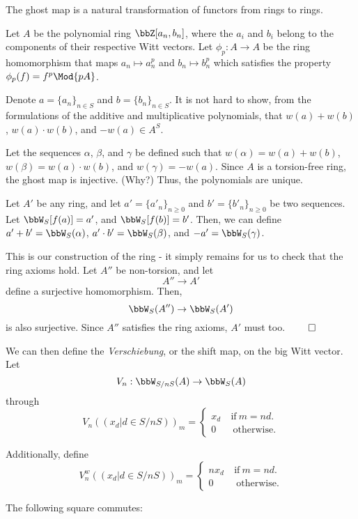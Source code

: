 \documentclass[a4paper, 12pt,oneside,openany]{book}
\begin{document}
The ghost map is a natural transformation of functors from rings to rings. 


 Let $A$ be the polynomial ring $\bbZ[a_n, b_n]$, where the $a_i$ and $b_i$ belong to the components of their respective Witt vectors. Let $\phi_p:A\to A$ be the ring homomorphism that maps $a_n \mapsto a_n^p$ and $b_n \mapsto b_n^p$ which satisfies the property $\phi_p(f)=f^p \Mod{pA}$. 

Denote $a = \{a_n\}_{n\in S}$ and $b = \{b_n\}_{n\in S}.$ It is not hard to show, from the formulations of the additive and multiplicative polynomials, that $w(a)+w(b)$, $w(a)\cdot w(b)$, and $-w(a) \in A^S.$ 

Let the sequences $\alpha$, $\beta$, and $\gamma$ be defined such that $w(\alpha)=w(a)+w(b)$, $w(\beta)=w(a)\cdot w(b)$, and $w(\gamma)=-w(a)$. Since $A$ is a torsion-free ring, the ghost map is injective. (Why?) Thus, the polynomials are unique.

Let $A'$ be any ring, and let $a'=\{a'_n\}_{n\geq0}$ and $b'=\{b'_n\}_{n\geq0}$ be two sequences. Let $\bbW_S[f(a)]=a'$, and $\bbW_S[f(b)]=b'$. Then, we can define $a'+b'=\bbW_S(\alpha)$, $a'\cdot b'=\bbW_S(\beta)$, and $-a'=\bbW_S(\gamma)$. 

This is our construction of the ring - it simply remains for us to check that the ring axioms hold. Let $A''$ be non-torsion, and let $$A'' \to A'$$ define a surjective homomorphism. Then, $$\bbW_S(A'') \to \bbW_S(A')$$ is also surjective. Since $A''$ satisfies the ring axioms, $A'$ must too. $\qed$

We can then define the \emph{Verschiebung}, or the shift map, on the big Witt vector. Let $$V_n:\bbW_{S/nS}(A) \to \bbW_{S}(A)$$ through $$V_n((x_d | d \in S/nS))_m = \begin{cases} x_d\ & \text{if}\ m=nd. \\ 0 & \ \text{otherwise}.  \end{cases}$$ 

Additionally, define $$V_n^w((x_d | d \in S/nS))_m = \begin{cases} nx_d\ & \text{if}\ m=nd. \\ 0 & \ \text{otherwise}.  \end{cases}$$

The following square commutes: 
\end{document}
